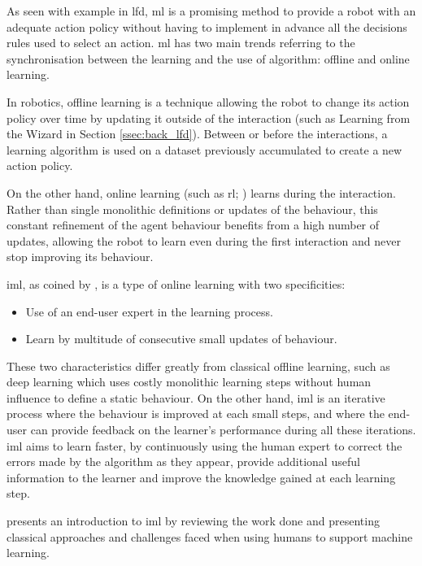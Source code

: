 As seen with example in \gls{lfd}, \acrfull{ml} is a promising method to provide a robot with an adequate action policy without having to implement in advance all the decisions rules used to select an action. \gls{ml} has two main trends referring to the synchronisation between the learning and the use of algorithm: offline and online learning.

In robotics, offline learning is a technique allowing the robot to change its action policy over time by updating it outside of the interaction (such as Learning from the Wizard in Section \ref{ssec:back_lfd}). Between or before the interactions, a learning algorithm is used on a dataset previously accumulated to create a new action policy.

On the other hand, online learning (such as \gls{rl}; \citealt{sutton1998reinforcement}) learns during the interaction. Rather than single monolithic definitions or updates of the behaviour, this constant refinement of the agent behaviour benefits from a high number of updates, allowing the robot to learn even during the first interaction and never stop improving its behaviour.

\acrfull{iml}, as coined by \cite{fails2003interactive}, is a type of online learning with two specificities:
\begin{itemize}
	\item Use of an end-user expert in the learning process.
	\item Learn by multitude of consecutive small updates of behaviour.
\end{itemize}
These two characteristics differ greatly from classical offline learning, such as deep learning \citep{lecun2015deep} which uses costly monolithic learning steps without human influence to define a static behaviour. On the other hand, \gls{iml} is an iterative process where the behaviour is improved at each small steps, and where the end-user can provide feedback on the learner's performance during all these iterations. \gls{iml} aims to learn faster, by continuously using the human expert to correct the errors made by the algorithm as they appear, provide additional useful information to the learner and improve the knowledge gained at each learning step.

\cite{amershi2014power} presents an introduction to \gls{iml} by reviewing the work done and presenting classical approaches and challenges faced when using humans to support machine learning.

